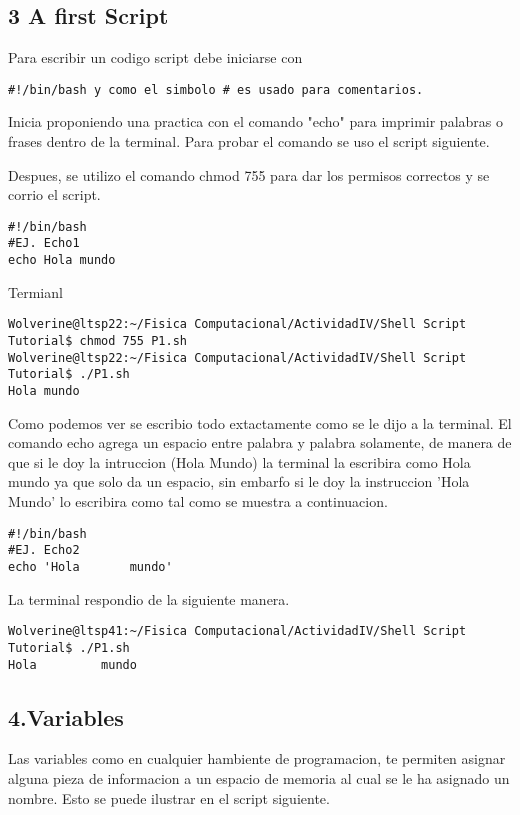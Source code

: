 \documentclass[a4paper]{article}
\begin{document}
\subsection{3 A first Script}
 Para escribir un codigo script debe iniciarse con
\begin{verbatim}
#!/bin/bash y como el simbolo # es usado para comentarios.
\end{verbatim}

Inicia proponiendo una practica con el comando "echo" para imprimir palabras o frases dentro de la terminal. Para probar el comando se uso el script siguiente.





Despues, se utilizo el comando chmod 755 para dar los permisos correctos y se corrio el script.
\begin{verbatim}
#!/bin/bash
#EJ. Echo1
echo Hola mundo
\end{verbatim}

Termianl

\begin{verbatim}
Wolverine@ltsp22:~/Fisica Computacional/ActividadIV/Shell Script Tutorial$ chmod 755 P1.sh
Wolverine@ltsp22:~/Fisica Computacional/ActividadIV/Shell Script Tutorial$ ./P1.sh
Hola mundo
\end{verbatim}

Como podemos ver se escribio todo extactamente como se le dijo a la terminal. El comando echo agrega un espacio entre palabra y palabra solamente, de manera de que si le doy la intruccion (Hola      Mundo) la terminal la escribira como Hola mundo ya que solo da un espacio, sin embarfo si le doy la instruccion 'Hola		Mundo' lo escribira como tal como se muestra a continuacion. 


\begin{verbatim}
#!/bin/bash
#EJ. Echo2
echo 'Hola		 mundo'
\end{verbatim}
La terminal respondio de la siguiente manera. 
\begin{verbatim}
Wolverine@ltsp41:~/Fisica Computacional/ActividadIV/Shell Script Tutorial$ ./P1.sh
Hola		 mundo

\end{verbatim}

\subsection{4.Variables}

Las variables como en cualquier hambiente de programacion, te permiten asignar alguna pieza de informacion a un espacio de memoria al cual se le ha asignado un nombre. Esto se puede ilustrar en el script siguiente. 
\end{document}
